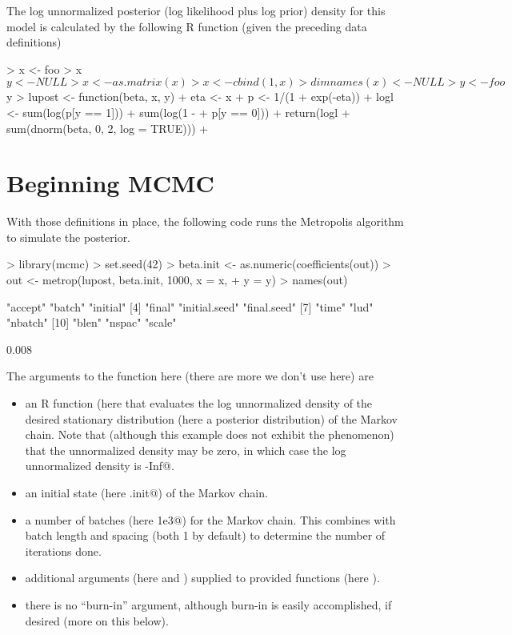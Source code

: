 \documentclass{article}
\begin{document}
The log unnormalized posterior (log likelihood plus log prior) density
for this model is calculated by
the following R function (given the preceding data definitions)
\begin{Schunk}
\begin{Sinput}
> x <- foo
> x$y <- NULL
> x <- as.matrix(x)
> x <- cbind(1, x)
> dimnames(x) <- NULL
> y <- foo$y
> lupost <- function(beta, x, y) {
+     eta <- x %*% beta
+     p <- 1/(1 + exp(-eta))
+     logl <- sum(log(p[y == 1])) + sum(log(1 - 
+         p[y == 0]))
+     return(logl + sum(dnorm(beta, 0, 2, log = TRUE)))
+ }
\end{Sinput}
\end{Schunk}

\section{Beginning MCMC}

With those definitions in place, the following code runs the Metropolis
algorithm to simulate the posterior.
\begin{Schunk}
\begin{Sinput}
> library(mcmc)
> set.seed(42)
> beta.init <- as.numeric(coefficients(out))
> out <- metrop(lupost, beta.init, 1000, x = x, 
+     y = y)
> names(out)
\end{Sinput}
\begin{Soutput}
 [1] "accept"       "batch"        "initial"     
 [4] "final"        "initial.seed" "final.seed"  
 [7] "time"         "lud"          "nbatch"      
[10] "blen"         "nspac"        "scale"       
\end{Soutput}
\begin{Soutput}
[1] 0.008
\end{Soutput}
\end{Schunk}

The arguments to the \verb@metrop@ function here (there are more we don't
use here) are
\begin{itemize}
\item an R function (here \verb@lupost@ that evaluates the log unnormalized
    density of the desired stationary distribution (here a posterior
    distribution) of the Markov chain.  Note that (although this example
    does not exhibit the phenomenon) that the unnormalized density may
    be zero, in which case the log unnormalized density is \verb@-Inf@.
\item an initial state (here \verb@beta.init@) of the Markov chain.
\item a number of batches (here \verb@1e3@) for the Markov chain.
    This combines with batch length and spacing (both 1 by default)
    to determine the number of iterations done.
\item additional arguments (here \verb@x@ and \verb@y@) supplied to
    provided functions (here \verb@lupost@).
\item there is no ``burn-in'' argument, although burn-in is easily
    accomplished, if desired (more on this below).
\end{itemize}
\end{document}
